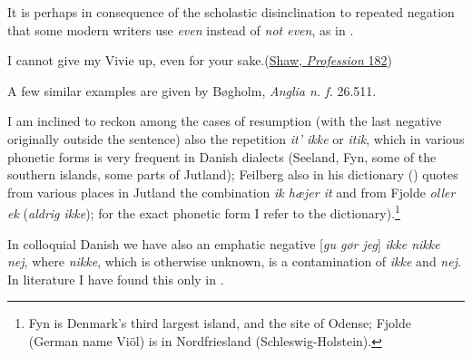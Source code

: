 It is perhaps in consequence of the scholastic disinclination to repeated negation that some modern writers use \textit{even} instead of \textit{not even}, as in .

\ea \label{ex:07-45}
I cannot give my Vivie up, even for your sake.\hfill(\href{https://archive.org/details/mrswarrensprofes00shawuoft/page/182/mode/2up?q=%22give+my+vivie%22&view=theater}{Shaw, \textit{Profession} 182})
\z

A few similar examples are given by Bøgholm, \textit{Anglia n. f.} 26.511. %

I am inclined to reckon among the cases of resumption (with the last negative originally outside the sentence) also the repetition \textit{it' ikke} or \textit{itik}, which in various phonetic forms is very frequent in Danish dialects (Seeland, %
Fyn, some of the southern islands, some parts of Jutland); Feilberg also in his dictionary (\citeyear{Feilberg1886Bidrag}) %
quotes from various places in Jutland the combination \textit{ik hæjer it} and from Fjolde \textit{oller ek} (\textit{aldrig ikke}); for the exact phonetic form I refer to the dictionary).\footnote{Fyn is Denmark's third largest island, and the site of Odense; Fjolde (German name Viöl) is in Nordfriesland (Schleswig-Holstein). \eds}

In colloquial Danish we have also an emphatic negative [\textit{gu gør jeg}] \textit{ikke nikke nej}, where \textit{nikke}, which is otherwise unknown, is a contamination of \textit{ikke} and \textit{nej}. In literature I have found this only in .


